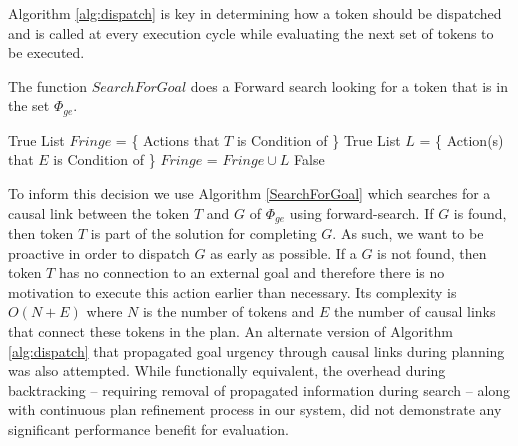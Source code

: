 Algorithm \ref{alg:dispatch} is key in determining how a token should
be dispatched and is called at every execution cycle while evaluating
the next set of tokens to be executed.  %

\begin{algorithm} [htb]
  \caption{\small The function $SearchForGoal$ does a Forward search
    looking for a token that is in the set $\Phi_{ge}$.}
  \label{SearchForGoal}
\begin{algorithmic}
  \small
  \State \Return True
  \Else 
  \State List $Fringe$ = \{ Actions that $T$ is Condition of \}
  \State \Return True
  \Else 
  \State List $L$ = \{ Action(s) that $E$ is Condition of \}
  \State $Fringe$ = $Fringe \cup L$ 
  \EndIf
  \EndFor
  \EndFor
  \EndIf
  \State \Return False
\EndFunction
\end{algorithmic}
\end{algorithm}



To inform this decision we use Algorithm \ref{SearchForGoal} which
searches for a causal link between the token $T$ and $G$ of
$\Phi_{ge}$ using forward-search. If $G$ is found, then token $T$ is
part of the solution for completing $G$. As such, we want to be
proactive in order to dispatch $G$ as early as possible. If a $G$ is
not found, then token $T$ has no connection to an external goal and
therefore there is no motivation to execute this action earlier than
necessary. Its complexity is $O(N+E)$ \cite{corman} where $N$ is the
number of tokens and $E$ the number of causal links that connect these
tokens in the plan. An alternate version of Algorithm
\ref{alg:dispatch} that propagated goal urgency through causal links
during planning was also attempted. While functionally equivalent, the
overhead during backtracking -- requiring removal of propagated
information during search -- along with continuous plan refinement
process in our system, did not demonstrate any significant performance
benefit for evaluation.

